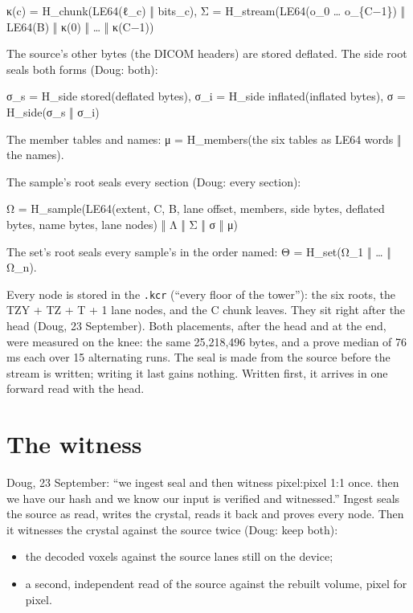 κ(c) = H\_\allowbreak{}chunk(LE64(ℓ\_\allowbreak{}c) ‖ bits\_\allowbreak{}c),  Σ = H\_\allowbreak{}stream(LE64(o\_\allowbreak{}0 … o\_\allowbreak{}\{C−1\}) ‖ LE64(B) ‖ κ(0) ‖ … ‖ κ(C−1))

The source's other bytes (the DICOM headers) are stored deflated. The side root seals both forms (Doug: both):

σ\_\allowbreak{}s = H\_\allowbreak{}side stored(deflated bytes),  σ\_\allowbreak{}i = H\_\allowbreak{}side inflated(inflated bytes),  σ = H\_\allowbreak{}side(σ\_\allowbreak{}s ‖ σ\_\allowbreak{}i)

The member tables and names: μ = H\_\allowbreak{}members(the six tables as LE64 words ‖ the names).

The sample's root seals every section (Doug: every section):

Ω = H\_\allowbreak{}sample(LE64(extent, C, B, lane offset, members, side bytes, deflated bytes, name bytes, lane nodes) ‖ Λ ‖ Σ ‖ σ ‖ μ)

The set's root seals every sample's in the order named: Θ = H\_\allowbreak{}set(Ω\_\allowbreak{}1 ‖ … ‖ Ω\_\allowbreak{}n).

Every node is stored in the \texttt{.\allowbreak{}kcr} (“every floor of the tower”): the six roots, the TZY + TZ + T + 1 lane nodes, and the C chunk leaves. They sit right after the head (Doug, 23 September). Both placements, after the head and at the end, were measured on the knee: the same 25,218,496 bytes, and a prove median of 76 ms each over 15 alternating runs. The seal is made from the source before the stream is written; writing it last gains nothing. Written first, it arrives in one forward read with the head.

\section{\texorpdfstring{The witness}{The witness}}

Doug, 23 September: “we ingest seal and then witness pixel:pixel 1:1 once. then we have our hash and we know our input is verified and witnessed.” Ingest seals the source as read, writes the crystal, reads it back and proves every node. Then it witnesses the crystal against the source twice (Doug: keep both):

\begin{itemize}
\item the decoded voxels against the source lanes still on the device;
\item a second, independent read of the source against the rebuilt volume, pixel for pixel.
\end{itemize}

